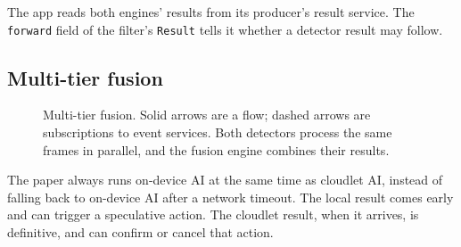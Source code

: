 \documentclass[11pt]{article}
\newcommand{\code}[1]{\texttt{#1}}
\begin{document}
The app reads both engines' results from its producer's result service. The
\code{forward} field of the filter's \code{Result} tells it whether a detector
result may follow.

\subsection{Multi-tier fusion}
\label{sec:fusion}

\begin{figure}[h]
\centering
{}
\caption{Multi-tier fusion. Solid arrows are a flow; dashed arrows are
subscriptions to event services. Both detectors process the same frames in
parallel, and the fusion engine combines their results.}
\label{fig:fusion}
\end{figure}

The paper always runs on-device AI at the same time as cloudlet AI, instead of
falling back to on-device AI after a network timeout. The local result comes
early and can trigger a speculative action. The cloudlet result, when it
arrives, is definitive, and can confirm or cancel that action.
\end{document}
